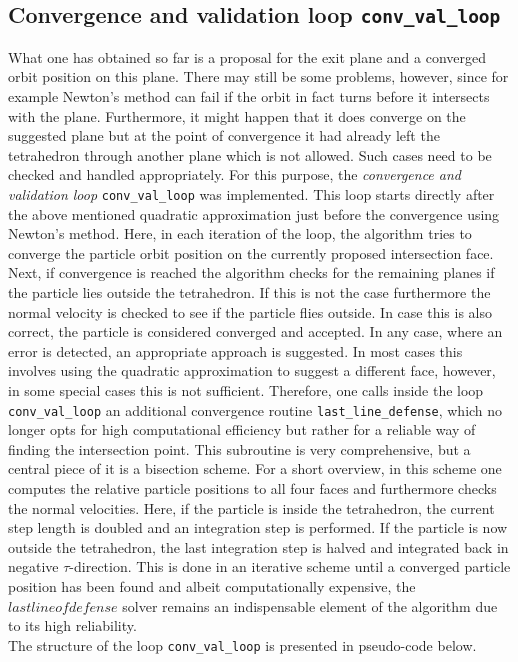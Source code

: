 \documentclass[./main.tex]{subfiles}
\begin{document}
\subsection{Convergence and validation loop \texttt{conv\_val\_loop}}
What one has obtained so far is a proposal for the exit plane and a converged orbit position on this plane. There may still be some problems, however, since for example Newton's method can fail if the orbit in fact turns before it intersects with the plane. Furthermore, it might happen that it does converge on the suggested plane but at the point of convergence it had already left the tetrahedron through another plane which is not allowed. Such cases need to be checked and handled appropriately. For this purpose, the \textit{convergence and validation loop} \texttt{conv\_val\_loop} was implemented. This loop starts directly after the above mentioned quadratic approximation just before the convergence using Newton's method. Here, in each iteration of the loop, the algorithm tries to converge the particle orbit position on the currently proposed intersection face. Next, if convergence is reached the algorithm checks for the remaining planes if the particle lies outside the tetrahedron. If this is not the case furthermore the normal velocity is checked to see if the particle flies outside. In case this is also correct, the particle is considered converged and accepted. In any case, where an error is detected, an appropriate approach is suggested. In most cases this involves using the quadratic approximation to suggest a different face, however, in some special cases this is not sufficient. Therefore, one calls inside the loop \texttt{conv\_val\_loop} an additional convergence routine \texttt{last\_line\_defense}, which no longer opts for high computational efficiency but rather for a reliable way of finding the intersection point. This subroutine is very comprehensive, but a central piece of it is a bisection scheme. For a short overview, in this scheme one computes the relative particle positions to all four faces and furthermore checks the normal velocities. Here, if the particle is inside the tetrahedron, the current step length is doubled and an integration step is performed. If the particle is now outside the tetrahedron, the last integration step is halved and integrated back in negative $\tau$-direction. This is done in an iterative scheme until a converged particle position has been found and albeit computationally expensive, the $last line of defense$ solver remains an indispensable element of the algorithm due to its high reliability. \\
The structure of the loop \texttt{conv\_val\_loop} is presented in pseudo-code below.
\end{document}
